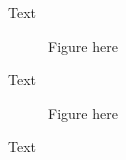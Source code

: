 \documentclass{article}
\begin{document}
    Text
    \begin{figure}[h!]
    Figure here
    \end{figure}
    \FloatBarrier
    Text
    \begin{figure}[h!]
    Figure here
    \end{figure}
    \FloatBarrier
    Text
\end{document}
